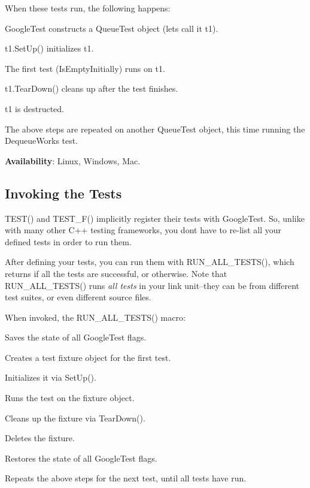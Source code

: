 When these tests run, the following happens\+:


\begin{DoxyEnumerate}
\item Google\+Test constructs a {\ttfamily Queue\+Test} object (let\textquotesingle{}s call it {\ttfamily t1}).
\item {\ttfamily t1.\+Set\+Up()} initializes {\ttfamily t1}.
\item The first test ({\ttfamily Is\+Empty\+Initially}) runs on {\ttfamily t1}.
\item {\ttfamily t1.\+Tear\+Down()} cleans up after the test finishes.
\item {\ttfamily t1} is destructed.
\item The above steps are repeated on another {\ttfamily Queue\+Test} object, this time running the {\ttfamily Dequeue\+Works} test.
\end{DoxyEnumerate}

{\bfseries Availability}\+: Linux, Windows, Mac.

\subsection*{Invoking the Tests}

{\ttfamily T\+E\+S\+T()} and {\ttfamily T\+E\+S\+T\+\_\+\+F()} implicitly register their tests with Google\+Test. So, unlike with many other C++ testing frameworks, you don\textquotesingle{}t have to re-\/list all your defined tests in order to run them.

After defining your tests, you can run them with {\ttfamily R\+U\+N\+\_\+\+A\+L\+L\+\_\+\+T\+E\+S\+T\+S()}, which returns {} if all the tests are successful, or {} otherwise. Note that {\ttfamily R\+U\+N\+\_\+\+A\+L\+L\+\_\+\+T\+E\+S\+T\+S()} runs {\itshape all tests} in your link unit--they can be from different test suites, or even different source files.

When invoked, the {\ttfamily R\+U\+N\+\_\+\+A\+L\+L\+\_\+\+T\+E\+S\+T\+S()} macro\+:


\begin{DoxyItemize}
\item Saves the state of all Google\+Test flags.
\item Creates a test fixture object for the first test.
\item Initializes it via {\ttfamily Set\+Up()}.
\item Runs the test on the fixture object.
\item Cleans up the fixture via {\ttfamily Tear\+Down()}.
\item Deletes the fixture.
\item Restores the state of all Google\+Test flags.
\item Repeats the above steps for the next test, until all tests have run.
\end{DoxyItemize}

